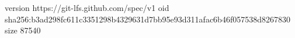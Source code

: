 version https://git-lfs.github.com/spec/v1
oid sha256:b3ad298fc611c3351298b4329631d7bb95e93d311afac6b46f057538d8267830
size 87540
